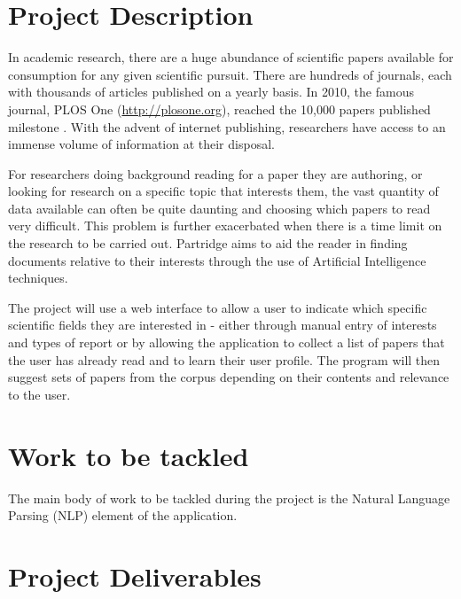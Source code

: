 \documentclass[12pt,a4paper]{article}
\begin{document}



\setlength{\parindent}{0pt}
\setlength{\parskip}{1.5ex plus 0.5ex minus 0.2ex}


\pagebreak

\section{Project Description}

In academic research, there are a huge abundance of scientific papers available for
consumption for any given scientific pursuit. There are hundreds of journals,
each with thousands of articles published on a yearly basis. In 2010, the famous journal,
PLOS One (\url{http://plosone.org}), reached the 10,000 papers published
milestone \cite{PlosOne2010}. With the advent of internet publishing,
researchers have access to an immense volume of information at their disposal.

For researchers doing background reading for a paper they are authoring, or looking for 
research on a specific topic that interests them, the vast quantity of data available can often be
quite daunting and choosing which papers to read very difficult. This problem
is further exacerbated when there is a time limit on the research to be carried
out. Partridge aims to aid the reader in finding documents relative to their
interests through the use of Artificial Intelligence techniques.

The project will use a web interface to allow a user to indicate which
specific scientific fields they are interested in - either through manual entry
of interests and types of report or by allowing the application to collect a
list of papers that the user has already read and to learn their user profile.
The program will then suggest sets of papers from the corpus depending on their
contents and relevance to the user.

\section{Work to be tackled}

The main body of work to be tackled during the project is the Natural Language
Parsing (NLP) element of the application. 



\section{Project Deliverables}

\pagebreak



\nocite{*}

\end{document}
